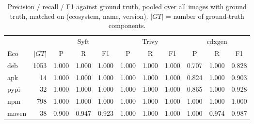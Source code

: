 \begin{table}[t]\centering\caption{Precision / recall / F1 against ground truth, pooled over all images with ground truth, matched on (ecosystem, name, version). $|GT|$ = number of ground-truth components.}\label{tab:byeco}
\small\begin{tabular}{lr ccc ccc ccc}\toprule
 & & \multicolumn{3}{c}{Syft} & \multicolumn{3}{c}{Trivy} & \multicolumn{3}{c}{cdxgen}\\
\cmidrule(lr){3-5}\cmidrule(lr){6-8}\cmidrule(lr){9-11}
Eco & $|GT|$ & P & R & F1 & P & R & F1 & P & R & F1 \\\midrule
deb & 1053 & 1.000 & 1.000 & 1.000 & 1.000 & 1.000 & 1.000 & 0.707 & 1.000 & 0.828 \\
apk & 14 & 1.000 & 1.000 & 1.000 & 1.000 & 1.000 & 1.000 & 0.824 & 1.000 & 0.903 \\
pypi & 32 & 1.000 & 1.000 & 1.000 & 1.000 & 1.000 & 1.000 & 0.865 & 1.000 & 0.928 \\
npm & 798 & 1.000 & 1.000 & 1.000 & 1.000 & 1.000 & 1.000 & 1.000 & 1.000 & 1.000 \\
maven & 38 & 0.900 & 0.947 & 0.923 & 1.000 & 1.000 & 1.000 & 1.000 & 0.974 & 0.987 \\
\bottomrule\end{tabular}\end{table}
